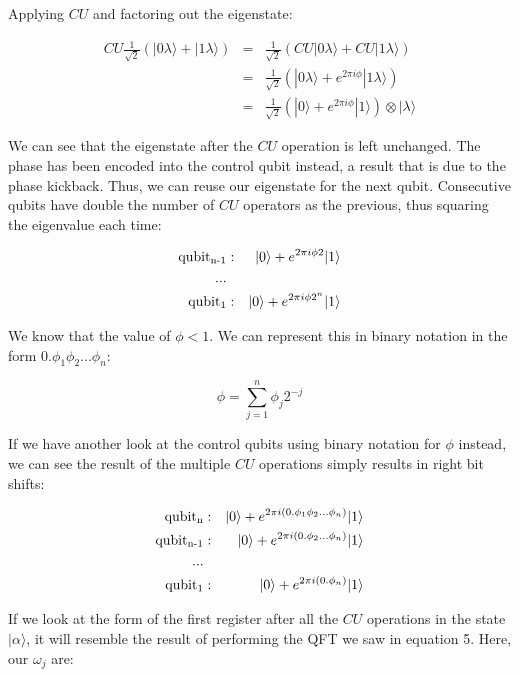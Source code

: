 \documentclass[msc,oneside]{ubcthesis}
\begin{document}
	Applying $CU$ and factoring out the eigenstate:
	
	\begin{eqnarray*}
		CU \frac{1}{\sqrt{2}}(|0 \lambda \rangle + |1 \lambda\rangle) &=&  \frac{1}{\sqrt{2}}(CU|0 \lambda \rangle + CU|1 \lambda\rangle )\\
		&=& \frac{1}{\sqrt{2}}(|0 \lambda \rangle + e^{2\pi i \phi}|1 \lambda\rangle)\\
		&=&\frac{1}{\sqrt{2}}( |0 \rangle + e^{2\pi i \phi}|1 \rangle)\otimes |\lambda\rangle
	\end{eqnarray*}
	
	We can see that the eigenstate after the $CU$ operation is left unchanged. The phase has been encoded into the control qubit instead, a result that is due to the phase kickback. Thus, we can reuse our eigenstate for the next qubit. Consecutive qubits have double the number of $CU$ operators as the previous, thus squaring the eigenvalue each time:
	
	\begin{eqnarray*}
		\text{qubit\textsubscript{n-1}} &:&   |0 \rangle + e^{2\pi i \phi 2}|1 \rangle \\
		...\\
		\text{qubit\textsubscript{1}} &:&   |0 \rangle + e^{2\pi i \phi 2^n}|1 \rangle
	\end{eqnarray*}
	
	We know that the value of $\phi < 1$. We can represent this in binary notation in the form $0.\phi_1\phi_2...\phi_n$:
	
	$$\phi = \sum_{j=1}^n \phi_j 2^{-j}$$
	
	If we have another look at the control qubits using binary notation for $\phi$ instead, we can see the result of the multiple $CU$ operations simply results in right bit shifts:
	
	
	\begin{eqnarray*}
		\text{qubit\textsubscript{n}} &:&   |0 \rangle +e^{2\pi i (0.\phi_1\phi_2...\phi_n)}|1 \rangle  \\
		\text{qubit\textsubscript{n-1}} &:&   |0 \rangle + e^{2\pi i (0.\phi_2...\phi_n)}|1 \rangle \\
		...\\
		\text{qubit\textsubscript{1}} &:&   |0 \rangle + e^{2\pi i (0.\phi_n)}|1 \rangle
	\end{eqnarray*}
	
	If we look at the form of the first register after all the $CU$ operations in the state $|\alpha\rangle$, it will resemble the result of performing the QFT we saw in equation 5. Here, our $\omega_j$ are:
	
\end{document}
